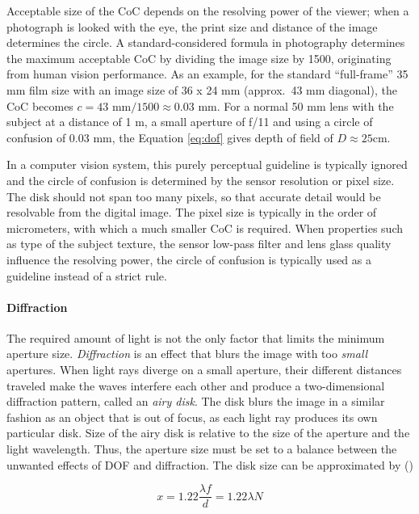 Acceptable size of the CoC depends on the resolving power of the viewer; when a photograph is looked with the eye, the print size and distance of the image determines the circle. \cite{greenleaf1950photographic}
A standard-considered formula in photography determines the maximum acceptable CoC by dividing the image size by 1500, originating from human vision performance.
\cite[p. 88, 92]{kingslake1992optics}
As an example, for the standard ``full-frame'' 35 mm film size with an image size of 36 x 24 mm (approx.\ 43 mm diagonal), the CoC becomes $c = 43 \text{ mm} / 1500 \approx 0.03 \text{ mm}$.
For a normal 50 mm lens with the subject at a distance of 1 m, a small aperture of f/11 and using a circle of confusion of 0.03 mm, the Equation \ref{eq:dof} gives depth of field of $D \approx 25 \text{cm}$. 

In a computer vision system, this purely perceptual guideline is typically ignored and the circle of confusion is determined by the sensor resolution or pixel size.
The disk should not span too many pixels, so that accurate detail would be resolvable from the digital image.
The pixel size is typically in the order of micrometers, with which a much smaller CoC is required.
When properties such as type of the subject texture, the sensor low-pass filter and lens glass quality influence the resolving power, the circle of confusion is typically used as a guideline instead of a strict rule.


\paragraph{Diffraction}
The required amount of light is not the only factor that limits the minimum aperture size.
\emph{Diffraction} is an effect that blurs the image with too \emph{small} apertures.
When light rays diverge on a small aperture, their different distances traveled make the waves interfere each other and produce a two-dimensional diffraction pattern, called an \emph{airy disk}.
\cite{greenleaf1950photographic}
The disk blurs the image in a similar fashion as an object that is out of focus, as each light ray produces its own particular disk.
Size of the airy disk is relative to the size of the aperture and the light wavelength.
Thus, the aperture size must be set to a balance between the unwanted effects of DOF and diffraction.
The disk size can be approximated by (\cite{greenleaf1950photographic})

\begin{equation} \label{eq:airydisk}
	x = 1.22 \frac{\lambda f}{d} = 1.22 \lambda N
\end{equation}


